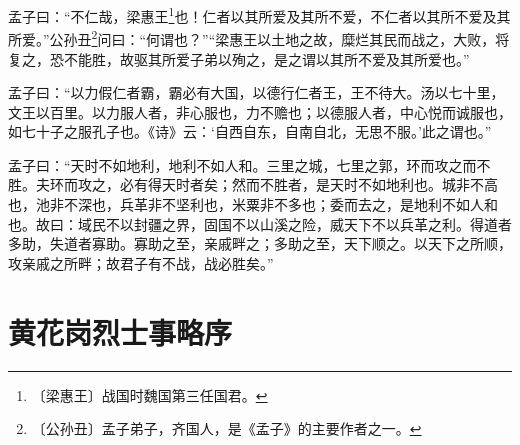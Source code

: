 \documentclass[12pt,UTF-8,openany]{ctexbook}
\begin{document}
\begin{normalsize}
    
    孟子曰：“不仁哉，梁惠王\footnote{〔梁惠王〕战国时魏国第三任国君。}也！仁者以其所爱及其所不爱，不仁者以其所不爱及其所爱。”公孙丑\footnote{〔公孙丑〕孟子弟子，齐国人，是《孟子》的主要作者之一。}问曰：“何谓也？”“梁惠王以土地之故，糜烂其民而战之，大败，将复之，恐不能胜，故驱其所爱子弟以殉之，是之谓以其所不爱及其所爱也。”
    
    孟子曰：“以力假仁者霸，霸必有大国，以德行仁者王，王不待大。汤以七十里，文王以百里。以力服人者，非心服也，力不赡也；以德服人者，中心悦而诚服也，如七十子之服孔子也。《诗》云：‘自西自东，自南自北，无思不服。’此之谓也。”
    
    孟子曰：“天时不如地利，地利不如人和。三里之城，七里之郭，环而攻之而不胜。夫环而攻之，必有得天时者矣；然而不胜者，是天时不如地利也。城非不高也，池非不深也，兵革非不坚利也，米粟非不多也；委而去之，是地利不如人和也。故曰：域民不以封疆之界，固国不以山溪之险，威天下不以兵革之利。得道者多助，失道者寡助。寡助之至，亲戚畔之；多助之至，天下顺之。以天下之所顺，攻亲戚之所畔；故君子有不战，战必胜矣。”
\end{normalsize}



\chapter{黄花岗烈士事略序}
\end{document}
